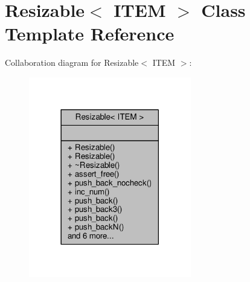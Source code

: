 \hypertarget{classResizable}{}\section{Resizable$<$ I\+T\+EM $>$ Class Template Reference}
\label{classResizable}


Collaboration diagram for Resizable$<$ I\+T\+EM $>$\+:
\nopagebreak
\begin{figure}[H]
\begin{center}
\leavevmode
\includegraphics[width=201pt]{d0/dab/classResizable__coll__graph}
\end{center}
\end{figure}
